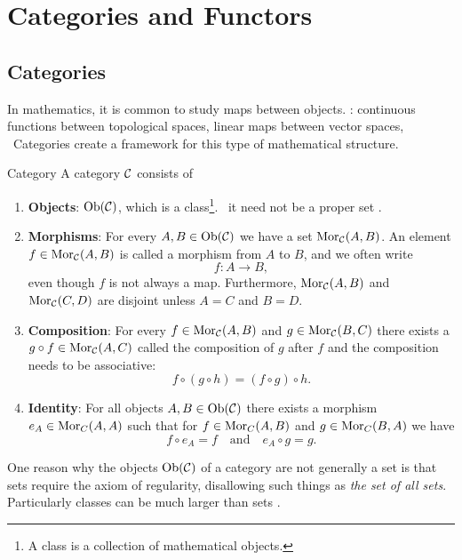 \chapter{Categories and Functors}
\label{chapter__category_theory}
\section{Categories}

In mathematics, it is common to study maps between objects.
\Eg: continuous functions between topological spaces, linear maps between vector spaces, \etc\
Categories create a framework for this type of mathematical structure.

\begin{definition}{Category \cite[Sec.~1.2]{Roman2017}}{}
A category $\mathcal{C}$ consists of
\begin{enumerate}
    \item \textbf{Objects}: $\mathrm {Ob}(\mathcal{C})$, which is a class\footnote{A class is a collection of mathematical objects.}. \Ie\ it need not be a proper set \cite[p.~1]{Roman2017}.
    
    \item \textbf{Morphisms}: For every $A, B \in \mathrm {Ob}(\mathcal{C})$ we have a set $\mathrm {Mor}_{\mathcal{C}}(A,B)$. An element $f \in \mathrm {Mor}_{\mathcal{C}}(A,B)$ is called a morphism from $A$ to $B$, and we often write 
    $$
    f: A \to B,
    $$
    even though $f$ is not always a map. Furthermore, $\mathrm {Mor}_{\mathcal{C}}(A,B)$ and $\mathrm {Mor}_{\mathcal{C}}(C,D)$ are disjoint unless $A = C$ and $B = D$.
    
    \item \textbf{Composition}: For every $f \in \mathrm {Mor}_{\mathcal{C}}(A,B)$ and $g \in \mathrm {Mor}_{\mathcal{C}}(B,C)$ there exists a $g \circ f \in \mathrm {Mor}_{\mathcal{C}}(A,C)$ called the composition of $g$ after $f$ and the composition needs to be associative: 
    $$
    f \circ (g \circ h) = (f \circ g) \circ h.
    $$

    \item \textbf{Identity}: For all objects $A,B \in \mathrm {Ob}(\mathcal{C})$ there exists a morphism $e_A \in \mathrm {Mor}_C(A,A)$ such that for $f \in \mathrm {Mor}_C(A,B)$ and $g \in \mathrm {Mor}_C(B,A)$ we have
    $$
    f \circ e_A = f \quad \text{and} \quad e_A \circ g = g.
    $$
\end{enumerate}
\end{definition}

One reason why the objects $\mathrm {Ob}(\mathcal{C})$ of a category are not generally a set is that sets require the axiom of regularity, 
disallowing such things as \emph{the set of all sets}. Particularly classes can be much larger than sets \cite[p.~1]{Roman2017}.

